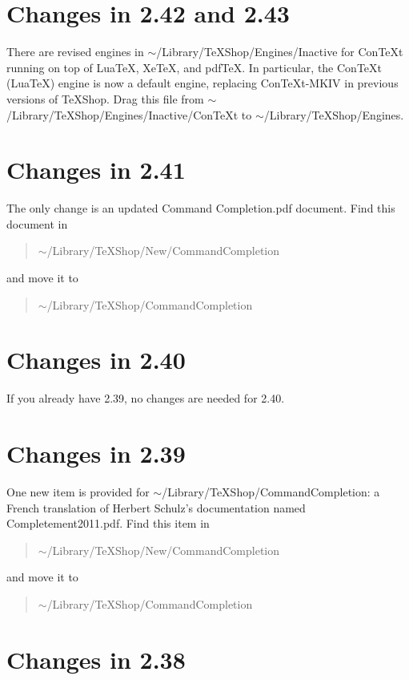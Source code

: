 \documentclass[11pt, oneside]{amsart}
\begin{document}
\section{Changes in 2.42 and 2.43}
There are revised engines in $\sim$/Library/TeXShop/Engines/Inactive for ConTeXt running on top of LuaTeX, XeTeX, and pdfTeX.
In particular, the ConTeXt (LuaTeX) engine is now a default engine, replacing ConTeXt-MKIV in previous versions of TeXShop. Drag this file
from $\sim$/Library/TeXShop/Engines/Inactive/ConTeXt to $\sim$/Library/TeXShop/Engines.



\section{Changes in 2.41}

The only change is an updated Command Completion.pdf document. Find this document in
\begin{quotation}
 $\sim$/Library/TeXShop/New/CommandCompletion
 \end{quotation}  and move it to  \begin{quotation}$\sim$/Library/TeXShop/CommandCompletion\end{quotation}

\section{Changes in 2.40}

If you already have 2.39, no changes are needed for 2.40.

\section{Changes in 2.39}

One new item is provided for 
	$\sim$/Library/TeXShop/CommandCompletion: a French translation of Herbert Schulz's documentation  named
	Completement2011.pdf.
Find this item in
\begin{quotation} 
$\sim$/Library/TeXShop/New/CommandCompletion
\end{quotation}
 and move it to 
 \begin{quotation}
 $\sim$/Library/TeXShop/CommandCompletion
 \end{quotation}


\section{Changes in 2.38}
\end{document}
